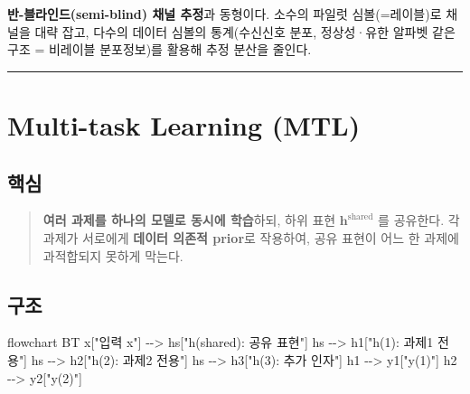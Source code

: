 \documentclass[
  letterpaper,
  DIV=11,
  numbers=noendperiod]{scrreprt}
\newenvironment{Shaded}{\begin{snugshade}}{\end{snugshade}}
\newcommand{\NormalTok}[1]{\textcolor[rgb]{0.00,0.23,0.31}{#1}}
\begin{document}
\begin{tcolorbox}[enhanced jigsaw, arc=.35mm, bottomrule=.15mm, bottomtitle=1mm, breakable, colback=white, colbacktitle=quarto-callout-note-color!10!white, colframe=quarto-callout-note-color-frame, coltitle=black, left=2mm, leftrule=.75mm, opacityback=0, opacitybacktitle=0.6, rightrule=.15mm, title=\textcolor{quarto-callout-note-color}{\faInfo}\hspace{0.5em}{무선통신 비유}, titlerule=0mm, toprule=.15mm, toptitle=1mm]

\textbf{반-블라인드(semi-blind) 채널 추정}과 동형이다. 소수의 파일럿
심볼(=레이블)로 채널을 대략 잡고, 다수의 데이터 심볼의 통계(수신신호
분포, 정상성·유한 알파벳 같은 구조 = 비레이블 분포정보)를 활용해 추정
분산을 줄인다.

\end{tcolorbox}

\begin{center}\rule{0.5\linewidth}{0.5pt}\end{center}

\chapter{Multi-task Learning (MTL)}\label{sec-mtl}

\section{핵심}\label{uxd575uxc2ec-3}

\begin{quote}
\textbf{여러 과제를 하나의 모델로 동시에 학습}하되, 하위 표현
\(\bm{h}^{\text{shared}}\) 를 공유한다. 각 과제가 서로에게
\textbf{데이터 의존적 prior}로 작용하여, 공유 표현이 어느 한 과제에
과적합되지 못하게 막는다.
\end{quote}

\section{구조}\label{uxad6cuxc870}

\begin{Shaded}
\begin{Highlighting}[]
\NormalTok{flowchart BT}
\NormalTok{    x["입력 x"] {-}{-}\textgreater{} hs["h(shared): 공유 표현"]}
\NormalTok{    hs {-}{-}\textgreater{} h1["h(1): 과제1 전용"]}
\NormalTok{    hs {-}{-}\textgreater{} h2["h(2): 과제2 전용"]}
\NormalTok{    hs {-}{-}\textgreater{} h3["h(3): 추가 인자"]}
\NormalTok{    h1 {-}{-}\textgreater{} y1["y(1)"]}
\NormalTok{    h2 {-}{-}\textgreater{} y2["y(2)"]}
\end{Highlighting}
\end{Shaded}
\end{document}
